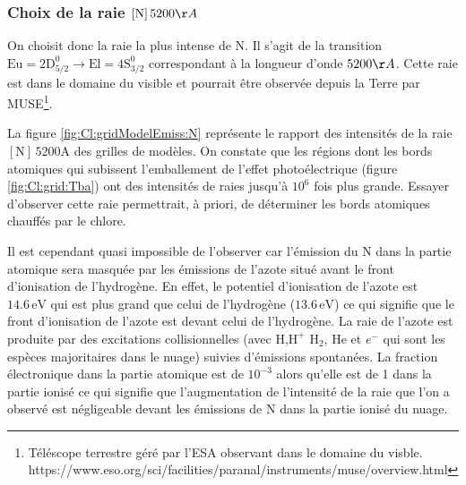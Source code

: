 


\subsubsection{Choix de la raie $[\mathrm{N}]\,5200 \AA$}

On choisit donc la raie la plus intense de $\mathrm{N}$. Il s'agit de la transition $\mathrm{Eu}=2\mathrm{D}^\mathrm{0}_{5/2} \rightarrow \mathrm{El}=4\mathrm{S}^\mathrm{0}_{3/2}$ correspondant à la longueur d'onde $5200 \AA$. Cette raie est dans le domaine du visible et pourrait être observée depuis la Terre par MUSE\footnote{
Téléscope terrestre géré par l'ESA observant dans le domaine du visble. \\
https://www.eso.org/sci/facilities/paranal/instruments/muse/overview.html}. \newline 

La figure \ref{fig:Cl:gridModelEmiss:N} représente le rapport des intensités de la raie $[\mathrm{N}]\,5200 \mathrm{A}$ des grilles de modèles. On constate que les régions dont les bords atomiques qui subissent l'emballement de l'effet photoélectrique (figure \ref{fig:Cl:grid:Tba}) ont des intensités de raies jusqu'à $10^6$ fois plus grande. Essayer d'observer cette raie permettrait, à priori, de déterminer les bords atomiques chauffés par le chlore. \newline 

Il est cependant quasi impossible de l'observer car l'émission du $\mathrm{N}$ dans la partie atomique sera masquée par les émissions de l'azote situé avant le front d'ionisation de l'hydrogène. En effet, le potentiel d'ionisation de l'azote est $14.6\,\mathrm{eV}$ qui est plus grand que celui de l'hydrogène ($13.6\,\mathrm{eV}$) ce qui signifie que le front d'ionisation de l'azote est devant celui de l'hydrogène. La raie de l'azote est produite par des excitations collisionnelles (avec $\mathrm{H}$,$\mathrm{H}^+$ $\mathrm{H}_2$, $\mathrm{He}$ et $e^-$ qui sont les espèces majoritaires dans le nuage) suivies d'émissions spontanées. La fraction électronique dans la partie atomique est de $10^{-3}$ alors qu'elle est de 1 dans la partie ionisé ce qui signifie que l'augmentation de l'intensité de la raie que l'on a observé est négligeable devant les émissions de $\mathrm{N}$ dans la partie ionisé du nuage.\newline

